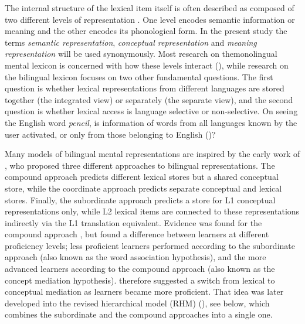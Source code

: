 \documentclass[output=paper,colorlinks,citecolor=brown,nonflat]{langsci/langscibook}
\begin{document}
{\sloppy The internal structure of the lexical item itself is often described as composed of two different levels of representation \citep{Levelt1989}. One level encodes semantic information or meaning and the other encodes its phonological form. In the present study the terms \textit{semantic representation}, \textit{conceptual representation} and \textit{meaning representation} will be used synonymously. Most research on the\linebreak monolingual mental lexicon is concerned with how these levels interact (\citealt{DellOSeaghdha1991, DellOSeaghdha1992, LeveltEtAl1991Picture, LeveltEtAl1991Reply, Levelt1992}), while research on the bilingual lexicon focuses on two other fundamental questions. The first question is whether lexical representations from different languages are stored together (the integrated view) or separately (the separate view), and the second question is whether lexical access is language selective or non-selective. On seeing the English word \textit{pencil}, is information of words from all languages known by the user activated, or only from those belonging to English (\citealt{Weinreich1953, SánchezCasasEtAl1992, Poulisse1997, DijkstraVanHeuven1998, DijkstraVanHeuven2002, VanHeuvenEtAl1998, VanHeuvenEtAl2011, Dijkstra2003, Dijkstra2005, LemhöferDijkstra2004, LemhöferEtAl2004, Costa2005,  KrollDeGroot2005, LaHeij2005, DijkstraEtAl2010, KrollEtAl2010, DeAngelisEtAl2015})?}

Many models of bilingual mental representations are inspired by the early work of \citet{Weinreich1953}, who proposed three different approaches to bilingual representations. The compound approach predicts different lexical stores but a shared conceptual store, while the coordinate approach predicts separate conceptual and lexical stores. Finally, the subordinate approach predicts a store for L1 conceptual representations only, while L2 lexical items are connected to these representations indirectly via the L1 translation equivalent. Evidence was found for the compound approach \citep{PotterEtAl1984}, but \citet{KrollCurley1988} found a difference between learners at different proficiency levels; less proficient learners performed according to the subordinate approach (also known as the word association hypothesis), and the more advanced learners according to the compound approach (also known as the concept mediation hypothesis). \citeauthor{KrollCurley1988} therefore suggested a switch from lexical to conceptual mediation as learners became more proficient. That idea was later developed into the revised hierarchical model (RHM) (\citealt{KrollStewart1994, KrollEtAl2010}), see  below, which combines the subordinate and the compound approaches into a single one.
\end{document}
